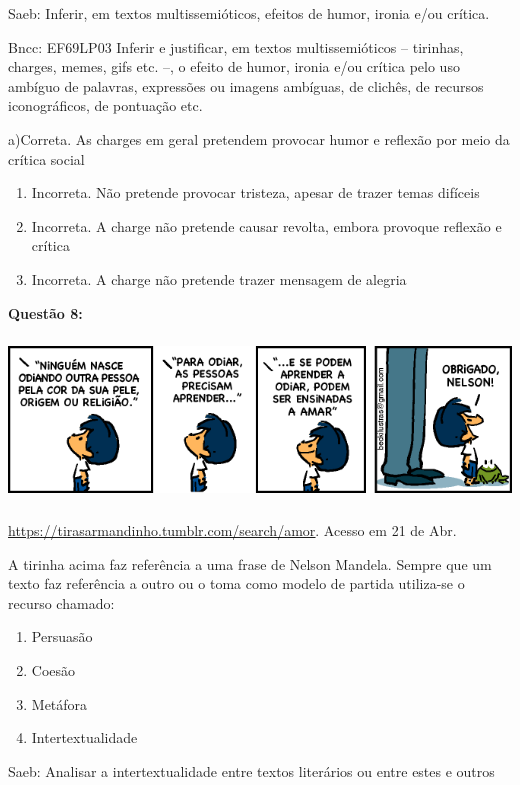 {Saeb: Inferir, em textos multissemióticos, efeitos de humor, ironia e/ou
crítica.

Bncc: EF69LP03 Inferir e justificar, em textos multissemióticos --
tirinhas, charges, memes, gifs etc. --, o efeito de humor, ironia e/ou
crítica pelo uso ambíguo de palavras, expressões ou imagens ambíguas, de
clichês, de recursos iconográficos, de pontuação etc.

a)Correta. As charges em geral pretendem provocar humor e reflexão por
meio da crítica social

\begin{enumerate}
\def\labelenumi{\arabic{enumi}.}
\item
  Incorreta. Não pretende provocar tristeza, apesar de trazer temas
  difíceis
\item
  Incorreta. A charge não pretende causar revolta, embora provoque
  reflexão e crítica
\item
  Incorreta. A charge não pretende trazer mensagem de alegria
\end{enumerate}

\textbf{Questão 8:}

\includegraphics[width=5.90551in,height=1.72222in]{./imgSAEB_7_POR/media/image18.png}

\href{https://tirasarmandinho.tumblr.com/search/amor}{\uline{https://tirasarmandinho.tumblr.com/search/amor}}.
Acesso em 21 de Abr.

A tirinha acima faz referência a uma frase de Nelson Mandela. Sempre que
um texto faz referência a outro ou o toma como modelo de partida
utiliza-se o recurso chamado:

\begin{enumerate}
\def\labelenumi{\alph{enumi})}
\item
  Persuasão
\item
  Coesão
\item
  Metáfora
\item
  Intertextualidade
\end{enumerate}

Saeb: Analisar a intertextualidade entre textos literários ou entre
estes e outros

}
